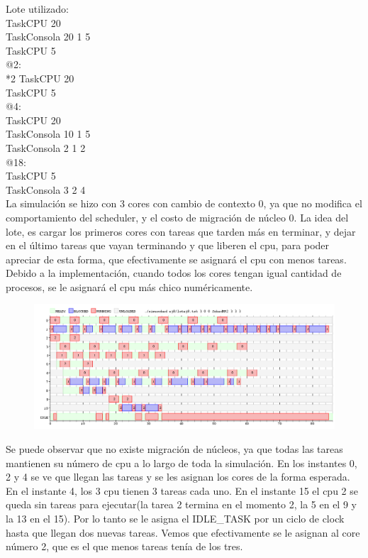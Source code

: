 Lote utilizado:\\

\noindent TaskCPU 20		\\
TaskConsola 20 1 5	\\
TaskCPU 5\\
@2: \\
*2 TaskCPU 20\\
TaskCPU 5\\
@4:\\
TaskCPU 20\\
TaskConsola 10 1 5\\
TaskConsola 2 1 2\\
@18:	\\			
TaskCPU 5\\
TaskConsola 3 2 4\\

La simulación se hizo con 3 cores con cambio de contexto 0, ya que no modifica el comportamiento del scheduler, y el costo de migración de núcleo 0.
La idea del lote, es cargar los primeros cores con tareas que tarden más en terminar, y dejar en el último tareas que vayan terminando y que liberen el cpu, para poder apreciar de esta forma, que efectivamente se asignará el cpu con menos tareas.
Debido a la implementación, cuando todos los cores tengan igual cantidad de procesos, se le asignará el cpu más chico numéricamente. 

\newpage

\begin{figure}[h]
  \includegraphics[width=\textwidth]{../ej8/rr2.png}
  \caption{}
\end{figure}

Se puede observar que no existe migración de núcleos, ya que todas las tareas mantienen su número de cpu a lo largo de toda la simulación.
En los instantes 0, 2 y 4 se ve que llegan las tareas y se les asignan los cores de la forma esperada. En el instante 4, los 3 cpu tienen 3 tareas cada uno. En el instante 15 el cpu 2 se queda sin tareas para ejecutar(la tarea 2 termina en el momento 2, la 5 en el 9 y la 13 en el 15). Por lo tanto se le asigna el IDLE_TASK por un ciclo de clock hasta que llegan dos nuevas tareas. Vemos que efectivamente se le asignan al core número 2, que es el que menos tareas tenía de los tres. 









